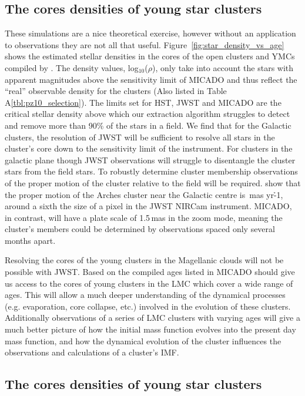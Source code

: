 \subsection{The cores densities of young star clusters}

These simulations are a nice theoretical exercise, however without an
application to observations they are not all that useful.
Figure~\ref{fig:star_density_vs_age} shows the estimated stellar densities in
the cores of the open clusters and YMCs compiled by \citet{portegies2010}. The
density values, log$_{10}$($\rho$), only take into account the stars with
apparent magnitudes above the sensitivity limit of MICADO and thus reflect the
``real'' observable density for the clusters (Also listed in Table
A\ref{tbl:pz10_selection}). The limits set for HST, JWST and MICADO are the
critical stellar density above which our extraction algorithm struggles to
detect and remove more than 90\% of the stars in a field. We find that for the
Galactic clusters, the resolution of JWST will be sufficient to resolve all
stars in the cluster's core down to the sensitivity limit of the instrument.
For clusters in the galactic plane though JWST observations will struggle to
disentangle the cluster stars from the field stars. To robustly determine
cluster membership observations of the proper motion of the cluster relative to
the field will be required. \citet{stolte2008} show that the proper motion of
the Arches cluster near the Galactic centre is \,mas yr\h{-1}, around a
sixth the size of a pixel in the JWST NIRCam instrument. MICADO, in contrast,
will have a plate scale of 1.5\,mas in the zoom mode, meaning the cluster's
members could be determined by observations spaced only several months apart.

Resolving the cores of the young clusters in the Magellanic clouds will not be
possible with JWST. Based on the compiled ages listed in \citet{portegies2010}
MICADO should give us access to the cores of young clusters in the LMC which
cover a wide range of ages. This will allow a much deeper understanding of the
dynamical processes (e.g. evaporation, core collapse, etc.) involved in the
evolution of these clusters. Additionally observations of a series of LMC
clusters with varying ages will give a much better picture of how the initial
mass function evolves into the present day mass function, and how the dynamical
evolution of the cluster influences the observations and calculations of a
cluster's IMF.


\subsection{The cores densities of young star clusters}

